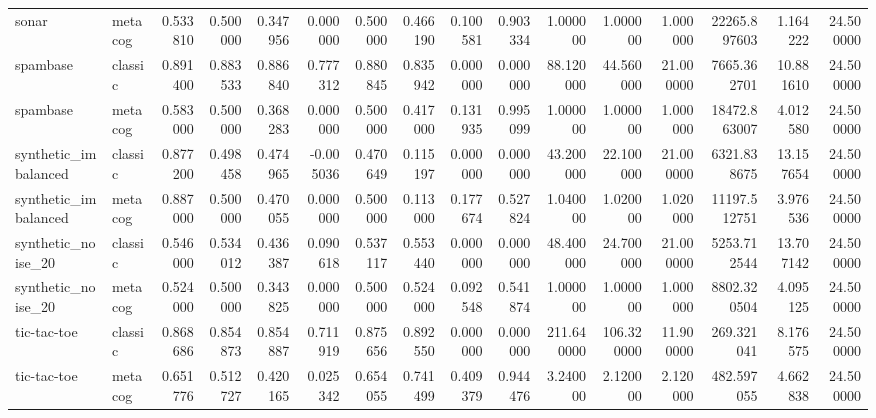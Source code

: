 \begin{tabular}{llrrrrrrrrrrrrrr}
sonar & metacog & 0.533810 & 0.500000 & 0.347956 & 0.000000 & 0.500000 & 0.466190 & 0.100581 & 0.903334 & 1.000000 & 1.000000 & 1.000000 & 22265.897603 & 1.164222 & 24.500000 \\
spambase & classic & 0.891400 & 0.883533 & 0.886840 & 0.777312 & 0.880845 & 0.835942 & 0.000000 & 0.000000 & 88.120000 & 44.560000 & 21.000000 & 7665.362701 & 10.881610 & 24.500000 \\
spambase & metacog & 0.583000 & 0.500000 & 0.368283 & 0.000000 & 0.500000 & 0.417000 & 0.131935 & 0.995099 & 1.000000 & 1.000000 & 1.000000 & 18472.863007 & 4.012580 & 24.500000 \\
synthetic_imbalanced & classic & 0.877200 & 0.498458 & 0.474965 & -0.005036 & 0.470649 & 0.115197 & 0.000000 & 0.000000 & 43.200000 & 22.100000 & 21.000000 & 6321.838675 & 13.157654 & 24.500000 \\
synthetic_imbalanced & metacog & 0.887000 & 0.500000 & 0.470055 & 0.000000 & 0.500000 & 0.113000 & 0.177674 & 0.527824 & 1.040000 & 1.020000 & 1.020000 & 11197.512751 & 3.976536 & 24.500000 \\
synthetic_noise_20 & classic & 0.546000 & 0.534012 & 0.436387 & 0.090618 & 0.537117 & 0.553440 & 0.000000 & 0.000000 & 48.400000 & 24.700000 & 21.000000 & 5253.712544 & 13.707142 & 24.500000 \\
synthetic_noise_20 & metacog & 0.524000 & 0.500000 & 0.343825 & 0.000000 & 0.500000 & 0.524000 & 0.092548 & 0.541874 & 1.000000 & 1.000000 & 1.000000 & 8802.320504 & 4.095125 & 24.500000 \\
tic-tac-toe & classic & 0.868686 & 0.854873 & 0.854887 & 0.711919 & 0.875656 & 0.892550 & 0.000000 & 0.000000 & 211.640000 & 106.320000 & 11.900000 & 269.321041 & 8.176575 & 24.500000 \\
tic-tac-toe & metacog & 0.651776 & 0.512727 & 0.420165 & 0.025342 & 0.654055 & 0.741499 & 0.409379 & 0.944476 & 3.240000 & 2.120000 & 2.120000 & 482.597055 & 4.662838 & 24.500000 \\
\bottomrule
\end{tabular}
